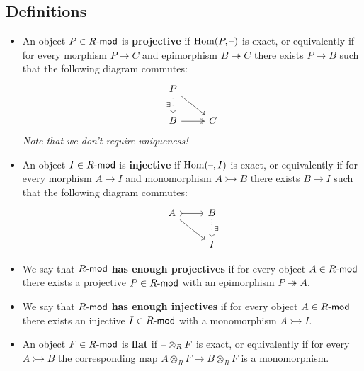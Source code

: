 \documentclass[10pt]{article}
\newcommand{\Rmod}{R\hbox{-}\mathsf{mod}}
\newcommand{\mono}{\rightarrowtail}
\newcommand{\epi}{\twoheadrightarrow}
\newcommand{\blank}{\hbox{--}}
\DeclareMathOperator{\Hom}{Hom}
\begin{document}
        \subsection{Definitions}

            \begin{itemize}
                \item An object $P\in\Rmod$ is \textbf{projective} if $\Hom(P,\blank)$ is exact, or equivalently if for every morphism $P\to C$ and epimorphism $B\epi C$ there exists $P\to B$ such that the following diagram commutes:
                    \begin{equation*}
                        \begin{tikzcd}
                            P \ar[dotted]{d}[swap]{\exists} \ar{dr} & \\
                            B \ar[two heads]{r} & C
                        \end{tikzcd}
                    \end{equation*}
                    \emph{Note that we don't require uniqueness!}
                \item An object $I\in\Rmod$ is \textbf{injective} if $\Hom(\blank,I)$ is exact, or equivalently if for every morphism $A\to I$ and monomorphism $A\mono B$ there exists $B\to I$ such that the following diagram commutes:
                    \begin{equation*}
                        \begin{tikzcd}
                            A \ar[tail]{r} \ar{dr} & B \ar[dotted]{d}{\exists}\\
                            & I
                        \end{tikzcd}
                    \end{equation*}
                \item We say that $\Rmod$ \textbf{has enough projectives} if for every object $A\in\Rmod$ there exists a projective $P\in\Rmod$ with an epimorphism $P\epi A$.
                \item We say that $\Rmod$ \textbf{has enough injectives} if for every object $A\in\Rmod$ there exists an injective $I\in\Rmod$ with a monomorphism $A\mono I$.
                \item An object $F\in\Rmod$ is \textbf{flat} if $\blank\otimes_R F$ is exact, or equivalently if for every $A\mono B$ the corresponding map $A\otimes_R F\to B\otimes_R F$ is a monomorphism.
            \end{itemize}
\end{document}
